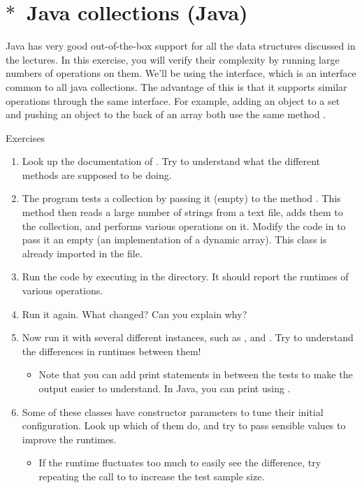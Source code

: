 \documentclass[12pt]{article}
\begin{document}
\clearpage
\section{$\ast$~Java collections (Java)}

Java has very good out-of-the-box support for all the data structures discussed in the lectures. In this exercise, you will verify their complexity by running large numbers of operations on them. We'll be using the  interface, which is an interface common to all java collections. The advantage of this is that it supports similar operations through the same interface. For example, adding an object to a set and pushing an object to the back of an array both use the same method .
%
\begin{mybox}{Exercises}
    \begin{enumerate}
        \item Look up the documentation of . Try to understand what the different methods are supposed to be doing.
        \item The program tests a collection by passing it (empty) to the method . This method then reads a large number of strings from a text file, adds them to the collection, and performs various operations on it. Modify the code in  to pass it an empty  (an implementation of a dynamic array). This class is already imported in the file.
        \item Run the code by executing  in the  directory. It should report the runtimes of various operations.
        \item Run it again. What changed? Can you explain why?
        \item Now run it with several different  instances, such as ,  and . Try to understand the differences in runtimes between them!
            \begin{itemize}
                \item Note that you can add print statements in between the tests to make the output easier to understand. In Java, you can print using .
            \end{itemize}
        \item Some of these classes have constructor parameters to tune their initial configuration. Look up which of them do, and try to pass sensible values to improve the runtimes.
            \begin{itemize}
                \item If the runtime fluctuates too much to easily see the difference, try repeating the call to  to increase the test sample size.
            \end{itemize}
    \end{enumerate}
\end{mybox}
\end{document}
